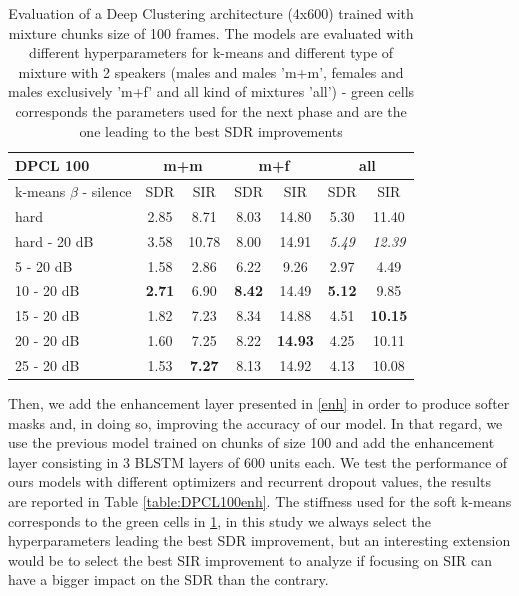 \documentclass[master, tikz, final,11pt, dvipdfmx]{iscs-thesis}
\begin{document}
\begin{table}[h]
\centering
\begin{tabular}{l|c|c|c|c|c|c}
DPCL 100 & \multicolumn{2}{c|}{m+m} & \multicolumn{2}{c|}{m+f} & \multicolumn{2}{c}{all} \\ 
\hline 
k-means $\beta$ - silence & SDR & SIR & SDR & SIR & SDR & SIR \\ 
\hline 
hard & 2.85 & 8.71 & 8.03 & 14.80 & 5.30 & 11.40 \\ 
hard - 20 dB & 3.58 & 10.78 & 8.00 & 14.91 & \textit{5.49} & \textit{12.39} \\ 
\hline 
\hline 
5 - 20 dB & 1.58 & 2.86 & 6.22 & 9.26 & 2.97 & 4.49 \\ 
10 - 20 dB &  \cellcolor{green}\textbf{2.71} & \cellcolor{green}6.90 & \cellcolor{green}\textbf{8.42} &\cellcolor{green} 14.49 & \cellcolor{green}\textbf{5.12} & \cellcolor{green}9.85 \\ 
15 - 20 dB & 1.82 & 7.23 & 8.34 & 14.88 & 4.51 & \textbf{10.15} \\ 
20 - 20 dB & 1.60 & 7.25 & 8.22 & \textbf{14.93} & 4.25 & 10.11 \\ 
25 - 20 dB & 1.53 & \textbf{7.27} & 8.13 & 14.92 & 4.13 & 10.08 \\ 
\end{tabular}
\caption[Evaluation of a Deep Clustering trained with chunks size of 100 frames]{Evaluation of a Deep Clustering architecture (4x600) trained with mixture chunks size of 100 frames. The models are evaluated with different hyperparameters for k-means and different type of mixture with 2 speakers (males and males 'm+m', females and males exclusively 'm+f' and all kind of mixtures 'all') - green cells corresponds the parameters used for the next phase and are the one leading to the best SDR improvements}
\label{table:DPCLV1}
\end{table}

Then, we add the enhancement layer presented in \autoref{enh} in order to produce softer masks and, in doing so, improving the accuracy of our model. In that regard, we use the previous model trained on chunks of size 100 and add the enhancement layer consisting in 3 BLSTM layers of 600 units each. We test the performance of ours models with different optimizers and recurrent dropout values, the results are reported in Table \ref{table:DPCL100enh}. The stiffness used for the soft k-means corresponds to the green cells in \ref{table:DPCLV1}, in this study we always select the hyperparameters leading the best SDR improvement, but an interesting extension would be to select the best SIR improvement to analyze if focusing on SIR can have a bigger impact on the SDR than the contrary.
\end{document}
